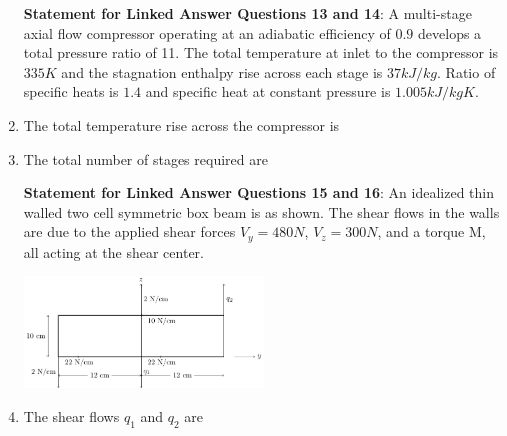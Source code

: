 \documentclass[journal,12pt,onecolumn]{IEEEtran}
\theoremstyle{remark}
\begin{document}
\begin{enumerate}
\textbf{Statement for Linked Answer Questions 13 and 14}: A multi-stage axial flow compressor operating at an adiabatic efficiency of $0.9$ develops a total pressure ratio of 11. The total temperature at inlet to the compressor is $335K$ and the stagnation enthalpy rise across each stage is $37 kJ/kg$. Ratio of specific heats is $1.4$ and specific heat at constant pressure is $1.005 kJ/kg K$.
\item The total temperature rise across the compressor is
\begin{enumerate}
\end{enumerate}

\item The total number of stages required are
\begin{enumerate}
\end{enumerate}

\textbf{Statement for Linked Answer Questions 15 and 16}: An idealized thin walled two cell symmetric box beam is as shown. The shear flows in the walls are due to the applied shear forces $V_{y} = 480 N$, $V_{z} = 300 N$, and a torque M, all acting at the shear center.

\includegraphics[width=0.5\textwidth]{image/fig2/fig2.pdf}


\item The shear flows $q_{1}$ and $q_{2}$ are
\begin{enumerate}
\end{enumerate}
\end{enumerate}
\end{document}
